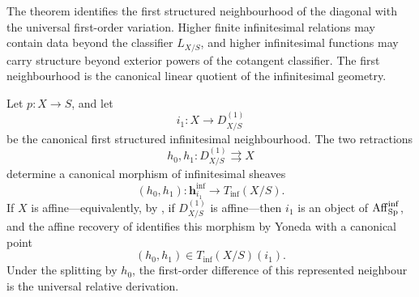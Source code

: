 \begin{remark}
\label{rem:first-order-not-all-infinitesimal}
The theorem identifies the first structured neighbourhood of the diagonal with
the universal first-order variation. Higher finite infinitesimal relations may
contain data beyond the classifier \(L_{X/S}\), and higher infinitesimal
functions may carry structure beyond exterior powers of the cotangent
classifier. The first neighbourhood is the canonical linear quotient of the
infinitesimal geometry.
\end{remark}

\begin{proposition}
\label{prop:first-diagonal-neighbour-pair}
Let \(p:X\to S\), and let
\[
    i_1:X\longrightarrow D^{(1)}_{X/S}
\]
be the canonical first structured infinitesimal neighbourhood. The two
retractions
\[
    h_0,h_1:D^{(1)}_{X/S}\rightrightarrows X
\]
determine a canonical morphism of infinitesimal sheaves
\[
    (h_0,h_1):
    \mathbf h^{\inf}_{i_1}
    \longrightarrow
    T_{\inf}(X/S).
\]
If \(X\) is affine---equivalently, by
, if
\(D^{(1)}_{X/S}\) is affine---then \(i_1\) is an object of
\(\operatorname{Aff}_{\operatorname{Sp}}^{\inf}\), and the affine recovery of  identifies
this morphism by Yoneda with a canonical point
\[
    (h_0,h_1)
    \in
    T_{\inf}(X/S)(i_1).
\]
Under the splitting by \(h_0\), the first-order difference of this represented
neighbour is the universal relative derivation.
\end{proposition}

